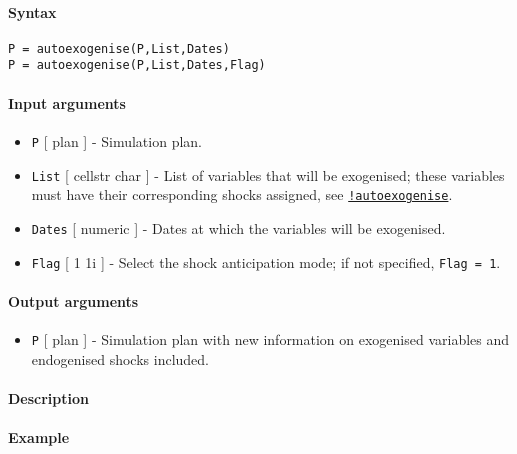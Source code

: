 


	\paragraph{Syntax}

\begin{verbatim}
P = autoexogenise(P,List,Dates)
P = autoexogenise(P,List,Dates,Flag)
\end{verbatim}

\paragraph{Input arguments}

\begin{itemize}
\item
  \texttt{P} {[} plan {]} - Simulation plan.
\item
  \texttt{List} {[} cellstr \textbar{} char {]} - List of variables that
  will be exogenised; these variables must have their corresponding
  shocks assigned, see
  \href{modellang/autoexogenise}{\texttt{!autoexogenise}}.
\item
  \texttt{Dates} {[} numeric {]} - Dates at which the variables will be
  exogenised.
\item
  \texttt{Flag} {[} 1 \textbar{} 1i {]} - Select the shock anticipation
  mode; if not specified, \texttt{Flag = 1}.
\end{itemize}

\paragraph{Output arguments}

\begin{itemize}
\itemsep1pt\parskip0pt
\item
  \texttt{P} {[} plan {]} - Simulation plan with new information on
  exogenised variables and endogenised shocks included.
\end{itemize}

\paragraph{Description}

\paragraph{Example}


